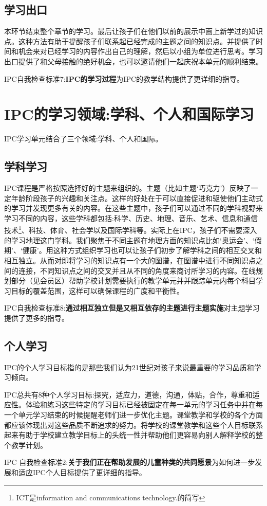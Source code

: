 \subsection{学习出口}
    本环节结束整个章节的学习。最后让孩子们在他们以前的展示中画上新学过的知识点。这种方法有助于提醒孩子们联系起已经完成的主题之间的知识点。并提供了时间和机会来对已经学习的内容作出自己的理解，然后以小组为单位进行思考。学习出口提供了和父母接触的绝好机会，也可以邀请他们一起庆祝本单元的顺利结束。 \par

    IPC自我检查标准7:\textbf{IPC的学习过程}为IPC的教学结构提供了更详细的指导。


\section{IPC的学习领域:学科、个人和国际学习}
   IPC学习单元结合了三个领域:学科、个人和国际。

\subsection{学科学习}
    IPC课程是严格按照选择好的主题来组织的。主题（比如主题‘巧克力’）反映了一定年龄阶段孩子的兴趣和关注点。这样的好处在于可以直接促进和驱使他们主动式的学习并发现更多有关的内容。在这些主题中，孩子们可以通过不同的学科视野来学习不同的内容，这些学科都包括:科学、历史、地理、音乐、艺术、信息和通信技术\footnote{ICT是information and communications technology.的简写}、科技、体育、社会学以及国际学科等。实际上在IPC，孩子们不需要深入的学习地理这门学科。我们聚焦于不同主题在地理方面的知识点比如‘奥运会’、‘假期’、‘健康’。用这种方式组织学习也可以让孩子们初步了解学科之间的相互交叉和相互独立。从而对即将学习的知识点有一个大的图谱，在图谱中进行不同知识点之间的连接，不同知识点之间的交叉并且从不同的角度来商讨所学习的内容。在线规划部分（见会员区）帮助学校计划需要执行的教学单元并并跟踪单元内每个科目学习目标的覆盖范围，这样可以确保课程的广度和平衡性。\par
    IPC自我检查标准8:\textbf{通过相互独立但是又相互依存的主题进行主题实施}对主题学习提供了更多的指导。

\subsection{个人学习}  
    IPC的个人学习目标指的是那些我们认为21世纪对孩子来说最重要的学习品质和学习倾向。\par
    IPC总共有8种个人学习目标:探究，适应力，道德，沟通，体贴，合作，尊重和适应性。体验和练习这些特定的学习目标已经被固定在每一单元的学习任务中并在每一个单元学习结束的时候提醒老师们进一步优化主题。课堂教学和学校的各个方面都应该体现出对这些品质不断追求的努力。将学校的课堂教学和这些个人目标联系起来有助于学校建立教学目标上的头统一性并帮助他们更容易向别人解释学校的整个教学计划。   \par
    IPC 自我检查标准2:\textbf{关于我们正在帮助发展的儿童种类的共同愿景}为如何进一步发展和适应IPC个人目标提供了更详细的指导。    

